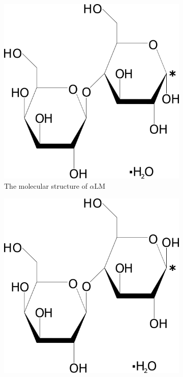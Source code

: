  \begin{figure}[h]
\centering
\begin{subfigure}{0.49\textwidth}
\centering
\includegraphics[scale = 0.6]{Figures/Misc/Theory/aLM_structure.png}
\captionsetup{font = footnotesize, justification = centering}
\caption{The molecular structure of ${\alpha}$LM}
\label{fig:aLMStruct}
\end{subfigure}
\hfill
\begin{subfigure}{0.49\textwidth}
\centering
\includegraphics[scale = 0.6]{Figures/Misc/Theory/bLM_structure.png}

\end{subfigure}
\end{figure}
